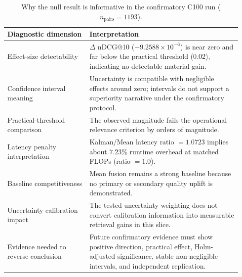 \begin{table}[t]
\centering
\caption{Why the null result is informative in the confirmatory C100 run ($n_{\text{pairs}}=1193$).}
\label{tab:negative-result-diagnostics}
\begin{tabular}{p{0.33\linewidth}p{0.61\linewidth}}
\toprule
Diagnostic dimension & Interpretation \\
\midrule
Effect-size detectability & $\Delta$ nDCG@10 ($-9.2588\times10^{-6}$) is near zero and far below the practical threshold (0.02), indicating no detectable material gain. \\
Confidence interval meaning & Uncertainty is compatible with negligible effects around zero; intervals do not support a superiority narrative under the confirmatory protocol. \\
Practical-threshold comparison & The observed magnitude fails the operational relevance criterion by orders of magnitude. \\
Latency penalty interpretation & Kalman/Mean latency ratio $=1.0723$ implies about $7.23\%$ runtime overhead at matched FLOPs (ratio $=1.0$). \\
Baseline competitiveness & Mean fusion remains a strong baseline because no primary or secondary quality uplift is demonstrated. \\
Uncertainty calibration impact & The tested uncertainty weighting does not convert calibration information into measurable retrieval gains in this slice. \\
Evidence needed to reverse conclusion & Future confirmatory evidence must show positive direction, practical effect, Holm-adjusted significance, stable non-negligible intervals, and independent replication. \\
\bottomrule
\end{tabular}
\end{table}
